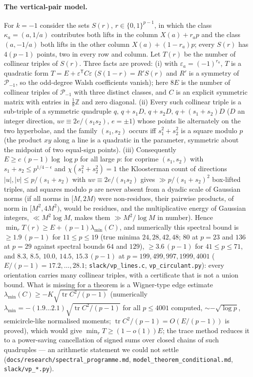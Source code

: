 \documentclass[11pt]{article}
\theoremstyle{remark}
\newcommand{\Pset}{\mathcal{P}}
\begin{document}
\paragraph{The vertical-pair model.}  For $k=-1$ consider the sets $S(r)$, $r\in\{0,1\}^{p-1}$, in which the class $\kappa_a=(a,1/a)$
contributes both lifts in the column $X(a)+r_ap$ and the class $(a,-1/a)$ both lifts in the other column $X(a)+(1-r_a)p$; every $S(r)$
has $4(p-1)$ points, two in every row and column.  Let $T(r)$ be the number of collinear triples of $S(r)$.  Three facts are proved:
(i) with $\varepsilon_a=(-1)^{r_a}$, $T$ is a quadratic form $T=E+\varepsilon^{\mathsf T}C\varepsilon$ ($S(1-r)=R'S(r)$ and $R'$ is a symmetry
of $\Pset_{-1}$, so the odd-degree Walsh coefficients vanish); here $8E$ is the number of collinear triples of $\Pset_{-1}$ with three
distinct classes, and $C$ is an explicit symmetric matrix with entries in $\tfrac18\mathbb Z$ and zero diagonal.  (ii) Every such collinear
triple is a sub-triple of a symmetric quadruple $q,\,q+s_1D,\,q+s_2D,\,q+(s_1+s_2)D$ ($D$ an integer direction, $uv\equiv2e/(s_1s_2)$,
$e=\pm1$) whose points lie alternately on the two hyperbolae, and the family $(s_1,s_2)$ occurs iff $s_1^2+s_2^2$ is a square modulo $p$
(the product $xy$ along a line is a quadratic in the parameter, symmetric about the midpoint of two equal-sign points).  (iii) Consequently
$E\ge c\,(p-1)\log\log p$ for all large $p$: for coprime $(s_1,s_2)$ with $s_1+s_2\le p^{1/4-\epsilon}$ and $\chi(s_1^2+s_2^2)=1$ the
Kloosterman count of directions $|u|,|v|\le p/(s_1+s_2)$ with $uv\equiv2e/(s_1s_2)$ gives $\gg p/(s_1+s_2)^2$ box-lifted triples, and
squares modulo $p$ are never absent from a dyadic scale of Gaussian norms (if all norms in $[M,2M)$ were non-residues, their pairwise
products, of norm in $[M^2,4M^2)$, would be residues, and the multiplicative energy of Gaussian integers, $\ll M^2\log M$, makes them
$\gg M^2/\log M$ in number).  Hence $\min_rT(r)\ge E+(p-1)\lambda_{\min}(C)$, and numerically this spectral bound is $\ge1.9\,(p-1)$ for
$11\le p\le19$ (true minima $24,28,42,48$; $80$ at $p=23$ and $136$ at $p=29$ against spectral bounds $64$ and $129$), $\ge3.6\,(p-1)$
for $41\le p\le71$, and $8.3,\,8.5,\,10.0,\,14.5,\,15.3\,(p-1)$ at $p=199,499,997,1999,4001$ ($E/(p-1)=17.2,\dots,28.1$;
\texttt{slack/vp\_lines.c}, \texttt{vp\_circulant.py}): every orientation carries many collinear triples, with a certificate that is not
a union bound.  What is missing for a
theorem is a Wigner-type edge estimate $\lambda_{\min}(C)\ge-K\sqrt{\operatorname{tr}C^2/(p-1)}$ (numerically $\lambda_{\min}=-(1.9\ldots2.1)\sqrt{\operatorname{tr}C^2/(p-1)}$ for all $p\le4001$
computed, $\sim-\sqrt{\log p}$, semicircle-like normalised moments; $\operatorname{tr}C^2/(p-1)=O(E/(p-1))$ is
proved), which would give $\min_rT\ge(1-o(1))E$; the trace method reduces it to a power-saving cancellation of signed sums over closed
chains of such quadruples --- an arithmetic statement we could not settle
(\texttt{docs/research/spectral\_programme.md}, \texttt{model\_theorem\_conditional.md}, \texttt{slack/vp\_*.py}).
\end{document}

